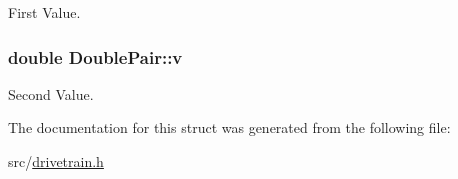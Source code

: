 First Value. 

\subsubsection[{\texorpdfstring{v}{v}}]{\setlength{\rightskip}{0pt plus 5cm}double Double\+Pair\+::v}\hypertarget{structDoublePair_ac04c81233ea3873cc9a790864a07735c}{}\label{structDoublePair_ac04c81233ea3873cc9a790864a07735c}


Second Value. 



The documentation for this struct was generated from the following file\+:\begin{DoxyCompactItemize}
\item 
src/\hyperlink{drivetrain_8h}{drivetrain.\+h}\end{DoxyCompactItemize}
